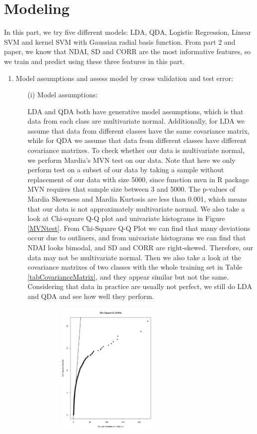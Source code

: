 \documentclass[11pt]{article}
\begin{document}
\section{Modeling}
In this part, we try five different models: LDA, QDA, Logistic Regression, Linear SVM and kernel SVM with Gaussian radial basis function. From part 2 and paper, we know that NDAI, SD and CORR are the most informative features, so we train and predict using these three features in this part.
\begin{enumerate}[label=(\alph*)]
\item Model assumptions and assess model by cross validation and test error:

\begin{enumerate}
\item[(i)] Model assumptions: \par
	LDA and QDA both have generative model assumptions, which is that data from each class are multivariate normal. Additionally, for LDA we assume that data from different classes have the same covariance matrix, while for QDA we assume that data from different classes have different covariance matrixes. To check whether our data is multivariate normal, we perform Mardia's MVN test on our data. Note that here we only perform test on a subset of our data by taking a sample without replacement of our data with size 5000, since function mvn in R package MVN requires that sample size between 3 and 5000. The p-values of Mardia Skewness and Mardia Kurtosis are less than 0.001, which means that our data is not approximately multivariate normal. We also take a look at Chi-square Q-Q plot and univariate histograms in Figure \ref{MVNtest}. From Chi-Square Q-Q Plot we can find that many deviations occur due to outliners, and from univariate histograms we can find that NDAI looks bimodal, and SD and CORR are right-skewed. Therefore, our data may not be multivariate normal. Then we also take a look at the covariance matrixes of two classes with the whole training set in Table \ref{tabCovarianceMatrix}, and they appear similar but not the same. Considering that data in practice are usually not perfect, we still do LDA and QDA and see how well they perform.
	\begin{figure}[h]
		\centering
		\includegraphics[width = 6.5cm,height = 6.5cm]{Figure/chisqqq.pdf}

\end{figure}
\end{enumerate}
\end{enumerate}
\end{document}
